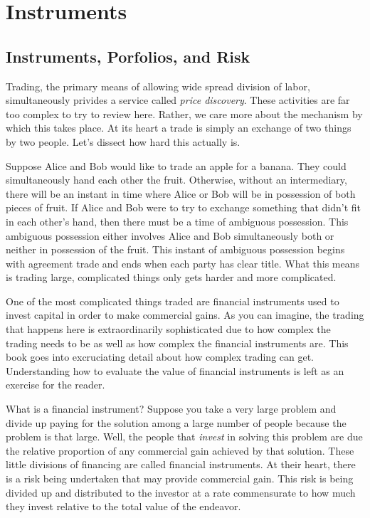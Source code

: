 

\chapter{Instruments}

\section{Instruments, Porfolios, and Risk}

Trading, the primary means of allowing wide spread division of labor, simultaneously privides
a service called \emph{price discovery}.  These activities are far too complex to try to
review here.  Rather, we care more about the mechanism by which this takes place.  At its heart
a trade is simply an exchange of two things by two people.  Let's dissect how hard this
actually is.

Suppose Alice and Bob would like to trade an apple for a banana.  They could simultaneously hand
each other the fruit.  Otherwise, without an intermediary, there will be an instant in time
where Alice or Bob will be in possession of both pieces of fruit.  If Alice and Bob were to
try to exchange something that didn't fit in each other's hand, then there must be a time
of ambiguous possession.  This ambiguous possession either involves Alice and Bob simultaneously
both or neither in possession of the fruit.  This instant of ambiguous possession begins with 
agreement trade and ends when each party has clear title.  What this means is trading large,
complicated things only gets harder and more complicated.

One of the most complicated things traded are financial instruments used to invest capital in
order to make commercial gains.  As you can imagine, the trading that happens here is
extraordinarily sophisticated due to how complex the trading needs to be as well as how
complex the financial instruments are.  This book goes into excruciating detail about how
complex trading can get. Understanding how to evaluate the value of financial instruments is
left as an exercise for the reader.

What is a financial instrument? Suppose you take a very large problem and divide up paying 
for the solution among a large number of people because the problem is that large.  Well, the 
people that \emph{invest} in
solving this problem are due the relative proportion of any commercial gain achieved by that
solution.  These little divisions of financing are called financial instruments.  At their
heart, there is a risk being undertaken that may provide commercial gain.  This risk is being
divided up and distributed to the investor at a rate commensurate to how much they invest
relative to the total value of the endeavor.

